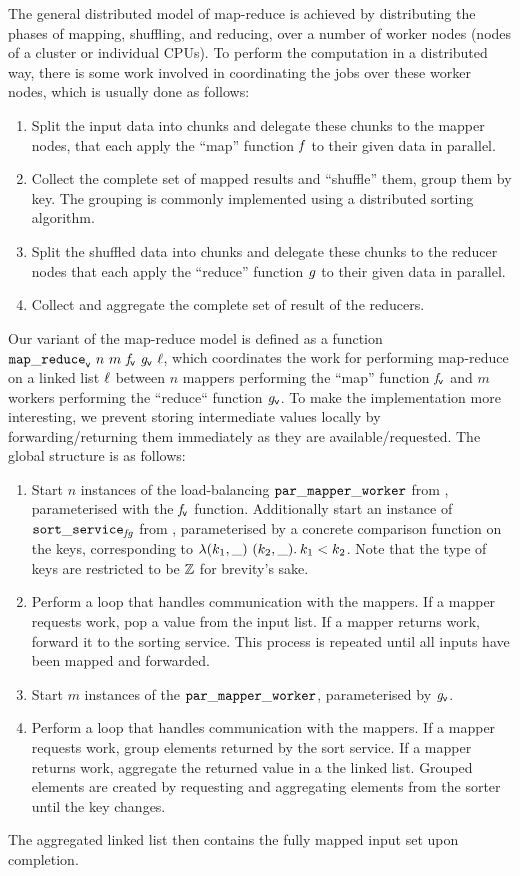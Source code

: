 The general distributed model of map-reduce is achieved by distributing the
phases of mapping, shuffling, and reducing, over a number of worker nodes
(\eg nodes of a cluster or individual CPUs).
To perform the computation in a distributed way, there is some work involved
in coordinating the jobs over these worker nodes,
which is usually done as follows:
\begin{enumerate}
\item Split the input data into chunks and delegate these chunks to the mapper
  nodes, that each apply the ``map'' function $\mathit{f}$ to their given data in parallel.
\item Collect the complete set of mapped results and ``shuffle'' them, \ie
  group them by key.
  The grouping is commonly implemented using a distributed sorting algorithm.
\item Split the shuffled data into chunks and delegate these chunks to the
  reducer nodes that each apply the ``reduce'' function $\mathit{g}$ to their given
  data in parallel.
\item Collect and aggregate the complete set of result of the reducers.
\end{enumerate}

\noindent
Our variant of the map-reduce model is defined as a function
$\vmapreducename\ n\ m\ \vmapvar\ \vredvar\ \loc$, which coordinates the work
for performing map-reduce on a linked list $\ell$ between $n$ mappers
performing the ``map'' function $\mathit{f}_{\mathsf v}$ and $m$ workers
performing the ``reduce`` function $\mathit{g}_{\mathsf v}$.
To make the implementation more interesting, we prevent storing intermediate
values locally by forwarding/returning them immediately as they are
available/requested.
The global structure is as follows:
\begin{enumerate}
\item Start $n$ instances of the load-balancing
  $\mathtt{par\_mapper\_worker}$ from ,
  parameterised with the $\mathit{f}_{\mathsf v}$ function.
  Additionally start an instance of $\mathtt{sort\_service}_{\mathit{fg}}$ from
  , parameterised by a concrete comparison
  function on the keys, corresponding to $\Lam (k_1,\_)\ (k_2,\_). k_1 < k_2$.
  Note that the type of keys are restricted to be $\mathbb{Z}$
  for brevity's sake. %
\item Perform a loop that handles communication with the mappers.
  If a mapper requests work, pop a value from the input list.
  If a mapper returns work, forward it to the sorting service.
  This process is repeated until all inputs have been mapped and forwarded.
\item Start $m$ instances of the $\mathtt{par\_mapper\_worker}$, parameterised by $\mathit{g}_{\mathsf v}$.
\item Perform a loop that handles communication with the mappers.
  If a mapper requests work, group elements returned by the sort service.
  If a mapper returns work, aggregate the returned value in a the linked
  list.
  Grouped elements are created by requesting and aggregating elements from the
  sorter until the key changes.
\end{enumerate}
The aggregated linked list then contains the fully mapped input set upon
completion.

